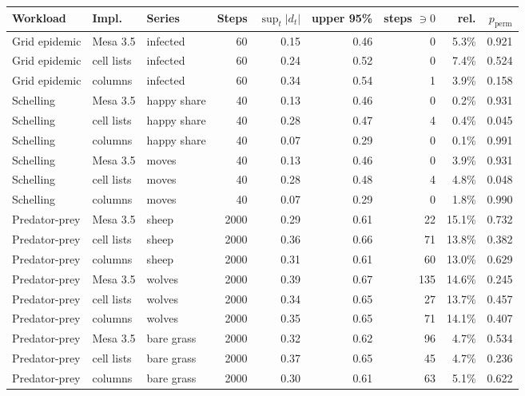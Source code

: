 \begin{tabular}{lllrrrrrr}
\toprule
Workload & Impl. & Series & Steps & $\sup_t |d_t|$ & upper 95\% & steps $\ni 0$ & rel. & $p_{\mathrm{perm}}$ \\
\midrule
Grid epidemic & Mesa 3.5 & infected & 60 & 0.15 & 0.46 & 0 & 5.3\% & 0.921 \\
Grid epidemic & cell lists & infected & 60 & 0.24 & 0.52 & 0 & 7.4\% & 0.524 \\
Grid epidemic & columns & infected & 60 & 0.34 & 0.54 & 1 & 3.9\% & 0.158 \\
Schelling & Mesa 3.5 & happy share & 40 & 0.13 & 0.46 & 0 & 0.2\% & 0.931 \\
Schelling & cell lists & happy share & 40 & 0.28 & 0.47 & 4 & 0.4\% & 0.045 \\
Schelling & columns & happy share & 40 & 0.07 & 0.29 & 0 & 0.1\% & 0.991 \\
Schelling & Mesa 3.5 & moves & 40 & 0.13 & 0.46 & 0 & 3.9\% & 0.931 \\
Schelling & cell lists & moves & 40 & 0.28 & 0.48 & 4 & 4.8\% & 0.048 \\
Schelling & columns & moves & 40 & 0.07 & 0.29 & 0 & 1.8\% & 0.990 \\
Predator-prey & Mesa 3.5 & sheep & 2000 & 0.29 & 0.61 & 22 & 15.1\% & 0.732 \\
Predator-prey & cell lists & sheep & 2000 & 0.36 & 0.66 & 71 & 13.8\% & 0.382 \\
Predator-prey & columns & sheep & 2000 & 0.31 & 0.61 & 60 & 13.0\% & 0.629 \\
Predator-prey & Mesa 3.5 & wolves & 2000 & 0.39 & 0.67 & 135 & 14.6\% & 0.245 \\
Predator-prey & cell lists & wolves & 2000 & 0.34 & 0.65 & 27 & 13.7\% & 0.457 \\
Predator-prey & columns & wolves & 2000 & 0.35 & 0.65 & 71 & 14.1\% & 0.407 \\
Predator-prey & Mesa 3.5 & bare grass & 2000 & 0.32 & 0.62 & 96 & 4.7\% & 0.534 \\
Predator-prey & cell lists & bare grass & 2000 & 0.37 & 0.65 & 45 & 4.7\% & 0.236 \\
Predator-prey & columns & bare grass & 2000 & 0.30 & 0.61 & 63 & 5.1\% & 0.622 \\
\bottomrule
\end{tabular}
